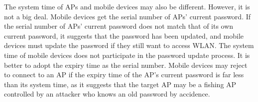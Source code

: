 The system time of APs and mobile devices may also be different. However, it is not a big deal. Mobile devices get the serial number of APs’ current password. If the serial number of APs’ current password does not match that of its own current password, it suggests that the password has been updated, and mobile devices must update the password if they still want to access WLAN. The system time of mobile devices does not participate in the password update process. It is better to adopt the expiry time as the serial number. Mobile devices may reject to connect to an AP if the expiry time of the AP’s current password is far less than its system time, as it suggests that the target AP may be a fishing AP controlled by an attacker who knows an old password by accidence. 

